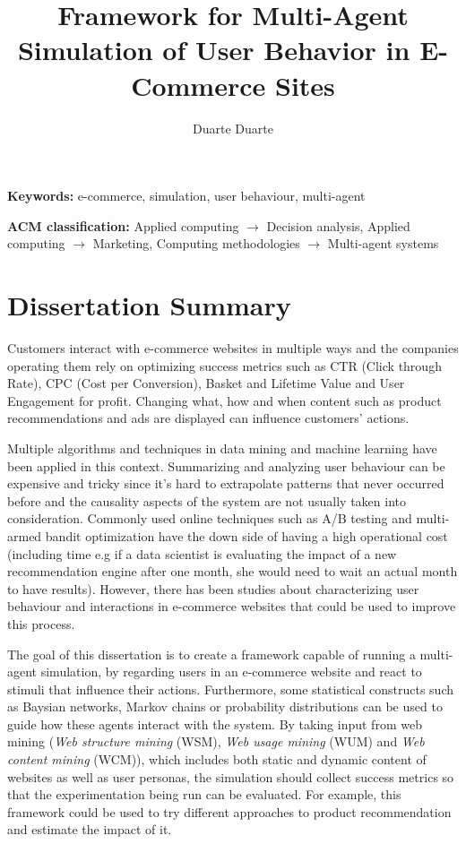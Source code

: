 \documentclass[a4paper]{article}
\title{Framework for Multi-Agent Simulation of User Behavior in E-Commerce Sites}
\author{Duarte Duarte}
\affil{Master in Informatics and Computing Engineering\\ Faculdade de Engenharia da Universidade do Porto}
\begin{document}
\maketitle

\textbf{Keywords: } e-commerce, simulation, user behaviour, multi-agent

\textbf{ACM classification: } Applied computing $\rightarrow$ Decision analysis, Applied computing $\rightarrow$ Marketing, Computing methodologies $\rightarrow$ Multi-agent systems

\section*{Dissertation Summary}

Customers interact with e-commerce websites in multiple ways and the companies operating them rely on optimizing success metrics such as CTR (Click through Rate), CPC (Cost per Conversion), Basket and Lifetime Value and User Engagement for profit. Changing what, how and when content such as product recommendations and ads are displayed can influence customers' actions.

Multiple algorithms and techniques in data mining and machine learning have been applied in this context. Summarizing and analyzing user behaviour can be expensive and tricky since it's hard to extrapolate patterns that never occurred before and the causality aspects of the system are not usually taken into consideration. Commonly used online techniques such as A/B testing and multi-armed bandit optimization have the down side of having a high operational cost (including time e.g if a data scientist is evaluating the impact of a new recommendation engine after one month, she would need to wait an actual month to have results). However, there has been studies about characterizing user behaviour and interactions in e-commerce websites that could be used to improve this process.

The goal of this dissertation is to create a framework capable of running a multi-agent simulation, by regarding users in an e-commerce website and react to stimuli that influence their actions. Furthermore, some statistical constructs such as Baysian networks, Markov chains or probability distributions can be used to guide how these agents interact with the system. By taking input from web mining (\emph{Web structure mining} (WSM), \emph{Web usage mining} (WUM) and \emph{Web content mining} (WCM)), which includes both static and dynamic content of websites as well as user personas, the simulation should collect success metrics so that the experimentation being run can be evaluated. For example, this framework could be used to try different approaches to product recommendation and estimate the impact of it.

\nocite{*}



\end{document}
